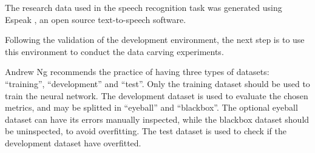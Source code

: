 

The research data used in the speech recognition task was generated using Espeak , an open source text-to-speech software. 

Following the validation of the development environment, the next step is to use this environment to conduct the data carving experiments.

Andrew Ng recommends the practice of having three types of datasets: ``training'', ``development'' and ``test''. Only the training dataset should be used to train the neural network. The development dataset is used to evaluate the chosen metrics, and may be splitted in ``eyeball'' and ``blackbox''. The optional eyeball dataset can have its errors manually inspected, while the blackbox dataset should be uninspected, to avoid overfitting. The test dataset is used to check if the development dataset have overfitted.


